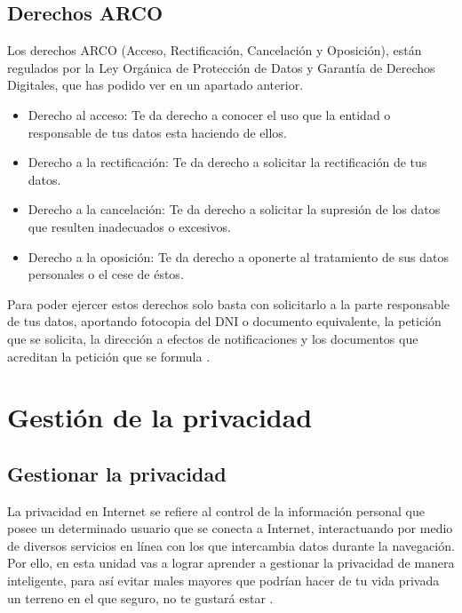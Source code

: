 \documentclass[
  spanish,
  a4paper,
  openany]{book}
\begin{document}
\hypertarget{derechos-arco}{%
\section{Derechos ARCO}\label{derechos-arco}}

Los derechos ARCO (Acceso, Rectificación, Cancelación y Oposición), están regulados por la Ley Orgánica de Protección de Datos y Garantía de Derechos Digitales, que has podido ver en un apartado anterior.

\begin{itemize}
\item
  Derecho al acceso: Te da derecho a conocer el uso que la entidad o responsable de tus datos esta haciendo de ellos.
\item
  Derecho a la rectificación: Te da derecho a solicitar la rectificación de tus datos.
\item
  Derecho a la cancelación: Te da derecho a solicitar la supresión de los datos que resulten inadecuados o excesivos.
\item
  Derecho a la oposición: Te da derecho a oponerte al tratamiento de sus datos personales o el cese de éstos.
\end{itemize}

Para poder ejercer estos derechos solo basta con solicitarlo a la parte responsable de tus datos, aportando fotocopia del DNI o documento equivalente, la petición que se solicita, la dirección a efectos de notificaciones y los documentos que acreditan la petición que se formula \citep{arco}.

\hypertarget{gestiuxf3n-de-la-privacidad}{%
\chapter{Gestión de la privacidad}\label{gestiuxf3n-de-la-privacidad}}

\hypertarget{gestionar-la-privacidad}{%
\section{Gestionar la privacidad}\label{gestionar-la-privacidad}}

La privacidad en Internet se refiere al control de la información personal que posee un determinado usuario que se conecta a Internet, interactuando por medio de diversos servicios en línea con los que intercambia datos durante la navegación. Por ello, en esta unidad vas a lograr aprender a gestionar la privacidad de manera inteligente, para así evitar males mayores que podrían hacer de tu vida privada un terreno en el que seguro, no te gustará estar \citep{WIKI-privacidad}.
\end{document}
